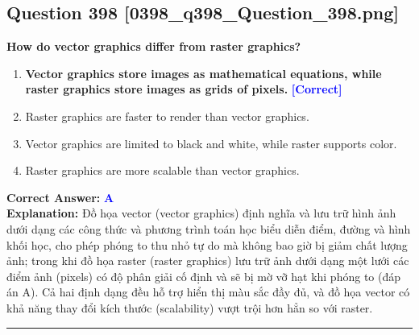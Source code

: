 \documentclass[11pt,a4paper]{article}
\begin{document}
\begin{minipage}{\textwidth}
\subsection*{Question 398 \quad \footnotesize{[0398\_q398\_Question\_398.png]}}
\noindent \textbf{How do vector graphics differ from raster graphics?}

\begin{enumerate}[label=\Alph*.]
    \item \textbf{Vector graphics store images as mathematical equations, while raster graphics store images as grids of pixels.} \hfill \textcolor{blue}{\textbf{[Correct]}}
    \item Raster graphics are faster to render than vector graphics.
    \item Vector graphics are limited to black and white, while raster supports color.
    \item Raster graphics are more scalable than vector graphics.
\end{enumerate}

\noindent \textbf{Correct Answer:} \textcolor{blue}{\textbf{A}} \\[2pt]
\noindent \textbf{Explanation:} Đồ họa vector (vector graphics) định nghĩa và lưu trữ hình ảnh dưới dạng các công thức và phương trình toán học biểu diễn điểm, đường và hình khối học, cho phép phóng to thu nhỏ tự do mà không bao giờ bị giảm chất lượng ảnh; trong khi đồ họa raster (raster graphics) lưu trữ ảnh dưới dạng một lưới các điểm ảnh (pixels) có độ phân giải cố định và sẽ bị mờ vỡ hạt khi phóng to (đáp án A). Cả hai định dạng đều hỗ trợ hiển thị màu sắc đầy đủ, và đồ họa vector có khả năng thay đổi kích thước (scalability) vượt trội hơn hẳn so với raster.

\par\vspace{0.3cm}
\hrule
\vspace{0.3cm}
\end{minipage}
\end{document}
